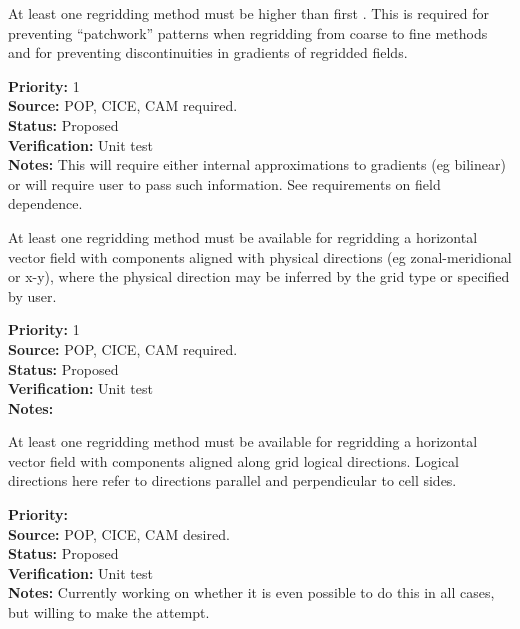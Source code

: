 
At least one regridding method must be higher than first
.  This is required for preventing
``patchwork'' patterns when regridding from coarse to fine
methods and for preventing discontinuities in gradients of
regridded fields.

\begin{reqlist}
{\bf Priority:} 1 \\
{\bf Source:}  POP, CICE, CAM required. \\
{\bf Status:} Proposed \\
{\bf Verification:} Unit test \\
{\bf Notes:} This will require either internal approximations to
             gradients (eg bilinear) or will require user
             to pass such information.  See requirements on field
             dependence.
\end{reqlist}


At least one regridding method must be available for regridding a horizontal
vector field with components aligned with physical directions 
(eg zonal-meridional or x-y), where the physical direction may be
inferred by the grid type or specified by user.

\begin{reqlist}
{\bf Priority:} 1 \\
{\bf Source:}  POP, CICE, CAM required. \\
{\bf Status:} Proposed \\
{\bf Verification:} Unit test \\
{\bf Notes:} 
\end{reqlist}


At least one regridding method must be available for regridding a horizontal
vector field with components aligned along grid logical directions.
Logical directions here refer to directions parallel and perpendicular
to cell sides.

\begin{reqlist}
{\bf Priority:}  \\
{\bf Source:}  POP, CICE, CAM desired. \\
{\bf Status:} Proposed \\
{\bf Verification:} Unit test \\
{\bf Notes:} Currently working on whether it is even possible to do this
             in all cases, but willing to make the attempt.
\end{reqlist}

